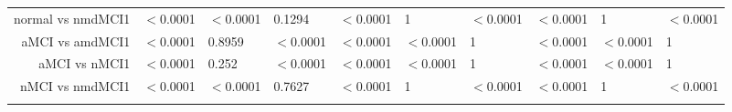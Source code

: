 \documentclass[12pt]{article}\usepackage[]{graphicx}\usepackage[]{color}
\begin{document}
\begin{table}[ht]
\begin{tabular}{rlllllllll}
  normal vs nmdMCI1 & $<$0.0001 & $<$0.0001 & 0.1294 & $<$0.0001 & 1 & $<$0.0001 & $<$0.0001 & 1 & $<$0.0001 \\ 
  aMCI vs amdMCI1 & $<$0.0001 & 0.8959 & $<$0.0001 & $<$0.0001 & $<$0.0001 & 1 & $<$0.0001 & $<$0.0001 & 1 \\ 
  aMCI vs nMCI1 & $<$0.0001 & 0.252 & $<$0.0001 & $<$0.0001 & $<$0.0001 & 1 & $<$0.0001 & $<$0.0001 & 1 \\ 
  nMCI vs nmdMCI1 & $<$0.0001 & $<$0.0001 & 0.7627 & $<$0.0001 & 1 & $<$0.0001 & $<$0.0001 & 1 & $<$0.0001 \\ 
   \hline
\multicolumn{9}{l}{}\\
\end{tabular}
\end{table}
\end{document}
